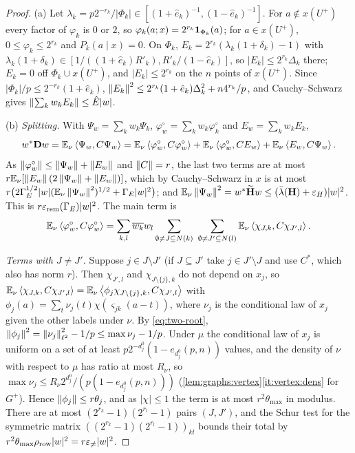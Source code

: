 \begin{proof}
(a) Let $\lambda_k=p2^{-r_k}/|\Phi_k|\in[(1+\hat e_k)^{-1},(1-\hat e_k)^{-1}]$. For
$a\notin x(U^+)$ every factor of $\varphi_k$ is $0$ or $2$, so
$\varphi_k(a;x)=2^{r_k}\mathbf 1_{\Phi_k}(a)$; for $a\in x(U^+)$, $0\le\varphi_k\le2^{r_k}$ and
$P_k(a\mid x)=0$. On $\Phi_k$, $E_k=2^{r_k}(\lambda_k(1+\delta_k)-1)$ with
$\lambda_k(1+\delta_k)\in[1/((1+\hat e_k)R'_k),R'_k/(1-\hat e_k)]$, so $|E_k|\le2^{r_k}\Delta_k$
there; $E_k=0$ off $\Phi_k\cup x(U^+)$, and $|E_k|\le2^{r_k}$ on the $n$ points of
$x(U^+)$. Since $|\Phi_k|/p\le2^{-r_k}(1+\hat e_k)$,
$\left\|E_k\right\|^2\le2^{r_k}(1+\hat e_k)\Delta_k^2+n4^{r_k}/p$, and Cauchy--Schwarz gives
$\left\|\sum_kw_kE_k\right\|\le\hat E|w|$.

(b) \emph{Splitting.} With $\Psi_w=\sum_kw_k\Psi_k$, $\varphi^\circ_w=\sum_kw_k\varphi^\circ_k$ and
$E_w=\sum_kw_kE_k$,
\[
  w^*\mathbf Dw=\mathbb E_\nu\left\langle \Psi_w,C\Psi_w\right\rangle=\mathbb E_\nu\left\langle \varphi^\circ_w,C\varphi^\circ_w\right\rangle
  +\mathbb E_\nu\left\langle \varphi^\circ_w,CE_w\right\rangle+\mathbb E_\nu\left\langle E_w,C\Psi_w\right\rangle.
\]
As $\left\|\varphi^\circ_w\right\|\le\left\|\Psi_w\right\|+\left\|E_w\right\|$ and $\left\|C\right\|=r$, the last two terms are
at most $r\mathbb E_\nu[\left\|E_w\right\|(2\left\|\Psi_w\right\|+\left\|E_w\right\|)]$, which by Cauchy--Schwarz in $x$
is at most $r\big(2\Gamma_E^{1/2}|w|(\mathbb E_\nu\left\|\Psi_w\right\|^2)^{1/2}+\Gamma_E|w|^2\big)$; and
$\mathbb E_\nu\left\|\Psi_w\right\|^2=w^*\widetilde{\mathbf H} w\le(\bar\lambda(\mathbf H)+\varepsilon_H)|w|^2$. This is
$r\varepsilon_{\rm rem}(\Gamma_E)|w|^2$. The main term is
\[
  \mathbb E_\nu\left\langle \varphi^\circ_w,C\varphi^\circ_w\right\rangle=\sum_{k,l}\overline{w_k}w_l
  \sum_{\emptyset\ne J\subseteq N(k)}\ \sum_{\emptyset\ne J'\subseteq N(l)}
  \mathbb E_\nu\left\langle \chi_{J,k},C\chi_{J',l}\right\rangle .
\]

\emph{Terms with $J\ne J'$.} Suppose $j\in J\setminus J'$ (if $J\subseteq J'$ take
$j\in J'\setminus J$ and use $C^*$, which also has norm $r$). Then $\chi_{J',l}$ and
$\chi_{J\setminus\{j\},k}$ do not depend on $x_j$, so
$\mathbb E_\nu\left\langle \chi_{J,k},C\chi_{J',l}\right\rangle=\mathbb E_\nu\left\langle \phi_j\chi_{J\setminus\{j\},k},C\chi_{J',l}\right\rangle$ with
$\phi_j(a)=\sum_t\nu_j(t)\chi(\varsigma_{jk}(a-t))$, where $\nu_j$ is the conditional law of
$x_j$ given the other labels under $\nu$. By \eqref{eq:two-root},
$\left\|\phi_j\right\|^2=\left\|\nu_j\right\|^2_{\ell^2}-1/p\le\max\nu_j-1/p$. Under $\mu$ the
conditional law of $x_j$ is uniform on a set of at least
$p2^{-d^0_j}(1-e_{d^0_j}(p,n))$ values, and the density of $\nu$ with respect to $\mu$
has ratio at most $R_\nu$, so $\max\nu_j\le R_\nu2^{d^0_j}/(p(1-e_{d^0_j}(p,n)))$
(\cref{lem:graphs:vertex}\ref{it:vertex:dens} for $G^+$). Hence
$\left\|\phi_j\right\|\le r\theta_j$, and as $|\chi|\le1$ the term is at most $r^2\theta_{\max}$
in modulus. There are at most $(2^{r_k}-1)(2^{r_l}-1)$ pairs $(J,J')$, and the
Schur test for the symmetric matrix $((2^{r_k}-1)(2^{r_l}-1))_{kl}$ bounds their
total by $r^2\theta_{\max}\rho_{\rm row}|w|^2=r\varepsilon_{\ne}|w|^2$.


\end{proof}
